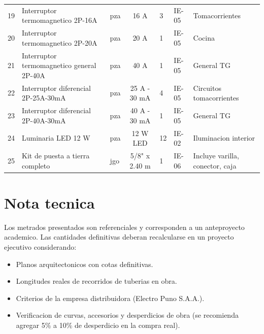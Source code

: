 \begin{landscape}
\begin{table}[H]
\begin{tabularx}{\textwidth}{c L{4.8cm} L{2.2cm} c L{1.8cm} L{3.0cm} Y}
19 & Interruptor termomagnetico 2P-16A & pza & 16 A & 3 & IE-05 & Tomacorrientes \\
20 & Interruptor termomagnetico 2P-20A & pza & 20 A & 1 & IE-05 & Cocina \\
21 & Interruptor termomagnetico general 2P-40A & pza & 40 A & 1 & IE-05 & General TG \\
22 & Interruptor diferencial 2P-25A-30mA & pza & 25 A - 30 mA & 4 & IE-05 & Circuitos tomacorrientes \\
23 & Interruptor diferencial 2P-40A-30mA & pza & 40 A - 30 mA & 1 & IE-05 & General TG \\
24 & Luminaria LED 12 W & pza & 12 W LED & 12 & IE-02 & Iluminacion interior \\
25 & Kit de puesta a tierra completo & jgo & 5/8" x 2.40 m & 1 & IE-06 & Incluye varilla, conector, caja \\
\bottomrule
\end{tabularx}
\end{table}
\end{landscape}

\section{Nota tecnica}

Los metrados presentados son referenciales y corresponden a un anteproyecto academico. Las cantidades definitivas deberan recalcularse en un proyecto ejecutivo considerando:

\begin{itemize}
  \item Planos arquitectonicos con cotas definitivas.
  \item Longitudes reales de recorridos de tuberias en obra.
  \item Criterios de la empresa distribuidora (Electro Puno S.A.A.).
  \item Verificacion de curvas, accesorios y desperdicios de obra (se recomienda agregar 5\% a 10\% de desperdicio en la compra real).
\end{itemize}
